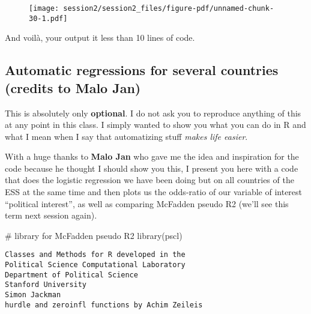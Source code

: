 \documentclass[
  letterpaper,
  DIV=11,
  numbers=noendperiod]{scrreprt}
\newenvironment{Shaded}{\begin{snugshade}}{\end{snugshade}}
\newcommand{\CommentTok}[1]{\textcolor[rgb]{0.37,0.37,0.37}{#1}}
\newcommand{\FunctionTok}[1]{\textcolor[rgb]{0.28,0.35,0.67}{#1}}
\newcommand{\NormalTok}[1]{\textcolor[rgb]{0.00,0.23,0.31}{#1}}
\begin{document}
\begin{figure}[H]

{\centering \texttt{[image: session2/session2\_files/figure-pdf/unnamed-chunk-30-1.pdf]}

}

\end{figure}

And voilà, your output it less than 10 lines of code.

\hypertarget{automatic-regressions-for-several-countries-credits-to-malo-jan}{%
\subsection{Automatic regressions for several countries (credits to Malo
Jan)}\label{automatic-regressions-for-several-countries-credits-to-malo-jan}}

This is absolutely only \textbf{optional}. I do not ask you to reproduce
anything of this at any point in this class. I simply wanted to show you
what you can do in R and what I mean when I say that automatizing stuff
\emph{makes life easier}.

With a huge thanks to \textbf{Malo Jan} who gave me the idea and
inspiration for the code because he thought I should show you this, I
present you here with a code that does the logistic regression we have
been doing but on all countries of the ESS at the same time and then
plots us the odds-ratio of our variable of interest ``political
interest'', as well as comparing McFadden pseudo R2 (we'll see this term
next session again).

\begin{Shaded}
\begin{Highlighting}[]
\CommentTok{\# library for McFadden pseudo R2}
\FunctionTok{library}\NormalTok{(pscl)}
\end{Highlighting}
\end{Shaded}

\begin{verbatim}
Classes and Methods for R developed in the
Political Science Computational Laboratory
Department of Political Science
Stanford University
Simon Jackman
hurdle and zeroinfl functions by Achim Zeileis
\end{verbatim}
\end{document}
